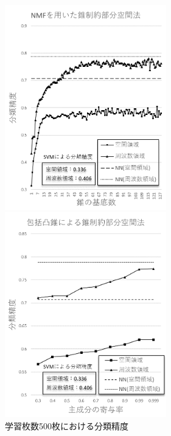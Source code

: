 \begin{figure}[htbp]
	\begin{minipage}{0.5\hsize}
		\begin{center}
			\includegraphics[width=70mm]{result/500-nmf.png}
		\end{center}
	\end{minipage}
	\begin{minipage}{0.5\hsize}
		\begin{center}
			\includegraphics[width=70mm]{result/500-comp.png}
		\end{center}
	\end{minipage}
	\caption{学習枚数500枚における分類精度}
\end{figure}

